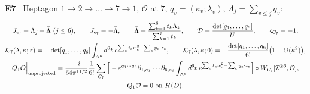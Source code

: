 \documentclass[10pt,a4paper]{article}
\numberwithin{equation}{section}
\newcommand{\cI}{\mathcal I}
\newcommand{\cK}{\mathcal K}
\newcommand{\cO}{\mathcal O}
\newcommand{\Ed}[1]{\textsf{11d}(#1)}
\newcommand{\rid}[1]{\par\medskip\noindent\textbf{#1}\ }
\newcommand{\ptr}[2]{\par\nopagebreak{\footnotesize\raggedleft[\,#1\ $\mid$\ #2\,]\par}}
\newcommand{\st}[1]{\textsf{#1}}
\begin{document}
\rid{E7} Heptagon $1\to2\to\dots\to7\to1$, $\cO$ at $7$, $q_v=(\kappa_v;\lambda_v)$, $\Lambda_j=\sum_{v\le j}q_v$:
\begin{gather*}
J_{e_j}=\Lambda_j-\bar\Lambda\ (j\le6),\qquad J_{e_7}=-\bar\Lambda,\qquad\bar\Lambda=\frac{\sum_{k=1}^6t_k\Lambda_k}{\sum_{k=1}^7t_k},\qquad\mathcal D=\frac{\det[q_1,\dots,q_6]}U,\qquad\varsigma_{C_7}=-1,\\
\cK_7(\lambda,\kappa;z)=-\det[q_1,\dots,q_6]\int_{\Delta^6}d^6t\;e^{\sum_et_ew_e^2-\sum_ey_e\cdot z_e},\qquad\cK_7(\lambda,\kappa;0)=-\frac{\det[q_1,\dots,q_6]}{6!}\big(1+O(\kappa^2)\big),\\
Q_1\cO\Big|_{\rm unprojected}=\frac{-i}{64\pi^{11/2}}\frac1{6!}\sum_{C_7}\Big[-\varepsilon^{a_1\cdots a_6}\partial_{1,a_1}\cdots\partial_{6,a_6}\int_{\Delta^6}d^6t\;e^{\sum_et_ew_e^2-\sum_ey_e\cdot z_e}\Big]\circ W_{C_7}[\cI^{\otimes6},\cO],\\
Q_1\cO=0\ \text{on }H(D).
\end{gather*}
\ptr{\Ed{6.1}; Thm 6.1 \Ed{6.2}, \Ed{6.3}$=$\Ed{0.8}; Cor.~6.2 \Ed{6.4}, \Ed{6.5}}{\st{P}; \st{C} (\st{N}), \st{R}: $\mathcal DU=\det[q]$}
\end{document}
